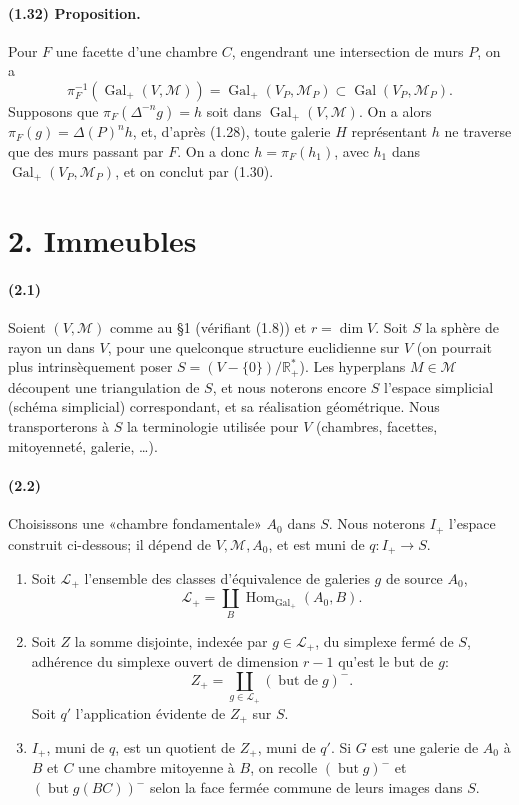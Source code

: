 \documentclass[10pt,a4paper]{article}
\newcommand{\R}{\mathbb R}
\newcommand{\mcL}{\mathcal L}
\begin{document}
\paragraph{(1.32) Proposition.} Pour \(F\) une facette d'une chambre \(C\), engendrant une intersection de murs \(P\), on a
\[
\pi_F^{-1}(\operatorname{Gal}_+(V,\mathcal M))
=
\operatorname{Gal}_+(V_P,\mathcal M_P)\subset \operatorname{Gal}(V_P,\mathcal M_P).
\]
Supposons que \(\pi_F(\Delta^{-n}g)=h\) soit dans \(\operatorname{Gal}_+(V,\mathcal M)\). On a alors \(\pi_F(g)=\Delta(P)^n h\), et, d'après (1.28), toute galerie \(H\) représentant \(h\) ne traverse que des murs passant par \(F\). On a donc \(h=\pi_F(h_1)\), avec \(h_1\) dans \(\operatorname{Gal}_+(V_P,\mathcal M_P)\), et on conclut par (1.30).

\section*{2. Immeubles}

\paragraph{(2.1)} Soient \((V,\mathcal M)\) comme au §1 (vérifiant (1.8)) et \(r=\dim V\). Soit \(S\) la sphère de rayon un dans \(V\), pour une quelconque structure euclidienne sur \(V\) (on pourrait plus intrinsèquement poser \(S=(V-\{0\})/\R^*_+\)). Les hyperplans \(M\in\mathcal M\) découpent une triangulation de \(S\), et nous noterons encore \(S\) l'espace simplicial (schéma simplicial) correspondant, et sa réalisation géométrique. Nous transporterons à \(S\) la terminologie utilisée pour \(V\) (chambres, facettes, mitoyenneté, galerie, \ldots).

\paragraph{(2.2)} Choisissons une «chambre fondamentale» \(A_0\) dans \(S\). Nous noterons \(I_+\) l'espace construit ci-dessous; il dépend de \(V,\mathcal M,A_0\), et est muni de \(q:I_+\to S\).
\begin{enumerate}[label=\alph*)]
\item Soit \(\mcL_+\) l'ensemble des classes d'équivalence de galeries \(g\) de source \(A_0\),
\[
\mcL_+=\coprod_B\operatorname{Hom}_{\operatorname{Gal}_+}(A_0,B).
\]
\item Soit \(Z\) la somme disjointe, indexée par \(g\in\mcL_+\), du simplexe fermé de \(S\), adhérence du simplexe ouvert de dimension \(r-1\) qu'est le but de \(g\):
\[
Z_+=\coprod_{g\in\mcL_+}(\operatorname{but\ de}g)^{-}.
\]
Soit \(q'\) l'application évidente de \(Z_+\) sur \(S\).
\item \(I_+\), muni de \(q\), est un quotient de \(Z_+\), muni de \(q'\). Si \(G\) est une galerie de \(A_0\) à \(B\) et \(C\) une chambre mitoyenne à \(B\), on recolle \((\operatorname{but}g)^{-}\) et \((\operatorname{but}g(BC))^{-}\) selon la face fermée commune de leurs images dans \(S\).
\end{enumerate}
\end{document}
